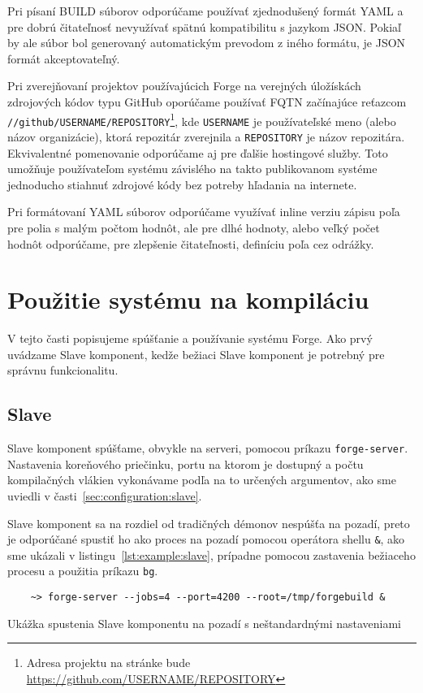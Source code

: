 Pri písaní BUILD súborov odporúčame používať zjednodušený formát YAML a pre dobrú
čitateľnosť nevyužívať spätnú kompatibilitu s jazykom JSON. Pokiaľ by ale súbor bol
generovaný automatickým prevodom z iného formátu, je JSON formát akceptovateľný.

Pri zverejňovaní projektov používajúcich Forge na verejných úložískách zdrojových
kódov typu GitHub oporúčame používať FQTN začínajúce reťazcom \texttt{//github/USERNAME/REPOSITORY}\footnote{Adresa projektu na stránke bude \url{https://github.com/USERNAME/REPOSITORY}},
kde \texttt{USERNAME} je používateľské meno (alebo názov organizácie), ktorá repozitár
zverejnila a \texttt{REPOSITORY} je názov repozitára. Ekvivalentné pomenovanie odporúčame
aj pre ďalšie hostingové služby. Toto umožňuje používateľom systému závislého na
takto publikovanom systéme jednoducho stiahnuť zdrojové kódy bez potreby hľadania
na internete.

Pri formátovaní YAML súborov odporúčame využívať inline verziu zápisu poľa pre
polia s malým počtom hodnôt, ale pre dlhé hodnoty, alebo veľký počet hodnôt odporúčame,
pre zlepšenie čitateľnosti, definíciu poľa cez odrážky.

\section{Pou\v{z}itie syst\'{e}mu na kompil\'{a}ciu}
\label{sec:usage}

V tejto časti popisujeme spúšťanie a používanie systému Forge. Ako prvý uvádzame
Slave komponent, kedže bežiaci Slave komponent je potrebný pre správnu funkcionalitu. 

\subsection{Slave}
\label{sec:usage:server}

Slave komponent spúšťame, obvykle na serveri, pomocou príkazu \texttt{forge-server}.
Nastavenia koreňového priečinku, portu na ktorom je dostupný a počtu kompilačných
vlákien vykonávame podľa na to určených argumentov, ako sme uviedli v časti~\ref{sec:configuration:slave}.

Slave komponent sa na rozdiel od tradičných démonov nespúšťa na pozadí, preto je
odporúčané spustiť ho ako proces na pozadí pomocou operátora shellu \texttt{\&},
ako sme ukázali v listingu~\ref{lst:example:slave}, prípadne
pomocou zastavenia bežiaceho procesu a použitia príkazu \texttt{bg}.

\begin{listing}
  \begin{verbatim}
    ~> forge-server --jobs=4 --port=4200 --root=/tmp/forgebuild &
  \end{verbatim}
  \caption[Ukážka spustenia Slave komponentu]{Ukážka spustenia Slave komponentu na pozadí s neštandardnými nastaveniami}
  \label{lst:example:slave}
\end{listing}


